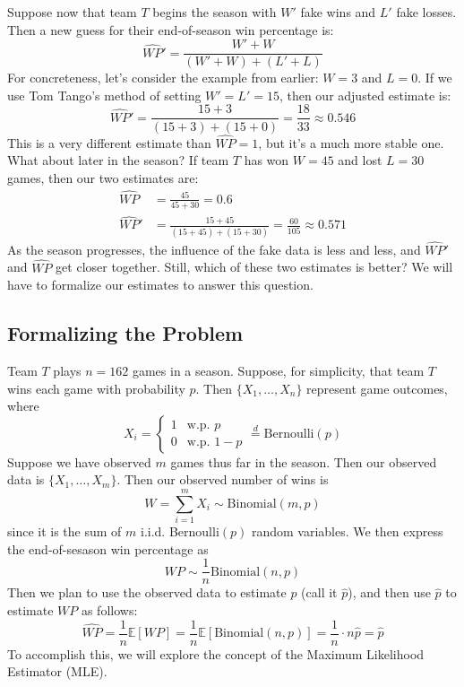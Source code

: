 \documentclass[twoside]{article}
\theoremstyle{definition}
\begin{document}
Suppose now that team $T$ begins the season with $W'$ fake wins and $L'$ fake losses. Then a new guess for their end-of-season win percentage is:
\begin{equation}
    \widehat{WP}' = \frac{W' + W}{(W' + W) + (L' + L)}
\end{equation}
For concreteness, let's consider the example from earlier: $W = 3$ and $L = 0$. If we use Tom Tango's method of setting $W' = L' = 15$, then our adjusted estimate is:
\begin{equation}
    \widehat{WP}' = \frac{15 + 3}{(15 + 3) + (15 + 0)} = \frac{18}{33} \approx 0.546
\end{equation}
This is a very different estimate than $\widehat{WP} = 1$, but it's a much more stable one. What about later in the season? If team $T$ has won $W = 45$ and lost $L = 30$ games, then our two estimates are:
\begin{align*}
    \widehat{WP} &= \frac{45}{45 + 30} = 0.6 \\
    \widehat{WP}' &= \frac{15 + 45}{(15 + 45) + (15 + 30)} = \frac{60}{105} \approx 0.571
\end{align*}
As the season progresses, the influence of the fake data is less and less, and $\widehat{WP}'$ and $\widehat{WP}$ get closer together. Still, which of these two estimates is better? We will have to formalize our estimates to answer this question.

\subsection{Formalizing the Problem}

Team $T$ plays $n = 162$ games in a season. Suppose, for simplicity, that team $T$ wins each game with probability $p$. Then $\{X_1, \hdots, X_n\}$ represent game outcomes, where
\begin{equation}
    X_i = \begin{cases}
        1 & \text{w.p. } p \\
        0 & \text{w.p. } 1 - p
    \end{cases} \stackrel{d}{=} \text{Bernoulli}(p)
\end{equation}
Suppose we have observed $m$ games thus far in the season. Then our observed data is $\{X_1, \hdots, X_m\}$. Then our observed number of wins is
\begin{equation}
    W = \sum_{i=1}^m X_i \sim \text{Binomial}(m, p)
\end{equation}
since it is the sum of $m$ i.i.d. Bernoulli$(p)$ random variables. We then express the end-of-sesason win percentage as
\begin{equation}
    WP \sim \frac{1}{n} \text{Binomial}(n, p)
\end{equation}
Then we plan to use the observed data to estimate $p$ (call it $\widehat{p}$), and then use $\widehat{p}$ to estimate $WP$ as follows:
\begin{equation}
    \widehat{WP} = \frac{1}{n} \mathbb{E}[WP] = \frac{1}{n} \mathbb{E}\left[\text{Binomial}(n, p)\right] = \frac{1}{n} \cdot n\widehat{p} = \widehat{p}
\end{equation}
To accomplish this, we will explore the concept of the Maximum Likelihood Estimator (MLE).
\end{document}
